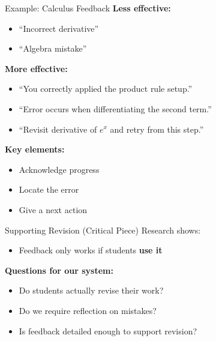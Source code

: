 \documentclass[dvipsnames]{beamer}
\begin{document}

\begin{frame}{Example: Calculus Feedback}
\textbf{Less effective:}
\begin{itemize}
\item “Incorrect derivative”
\item “Algebra mistake”
\end{itemize}

\vspace{1em}

\textbf{More effective:}
\begin{itemize}
\item “You correctly applied the product rule setup.”
\item “Error occurs when differentiating the second term.”
\item “Revisit derivative of $e^x$ and retry from this step.”
\end{itemize}

\vspace{1em}

\textbf{Key elements:}
\begin{itemize}
\item Acknowledge progress
\item Locate the error
\item Give a next action
\end{itemize}
\end{frame}


\begin{frame}{Supporting Revision (Critical Piece)}
Research shows:
\begin{itemize}
\item Feedback only works if students \textbf{use it}
\end{itemize}

\vspace{1em}

\textbf{Questions for our system:}
\begin{itemize}
\item Do students actually revise their work?
\item Do we require reflection on mistakes?
\item Is feedback detailed enough to support revision?
\end{itemize}
\end{frame}
\end{document}
